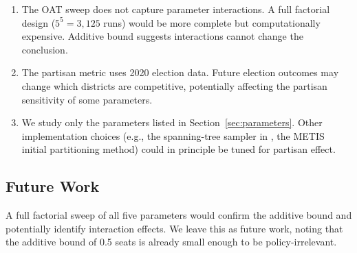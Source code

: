 \begin{enumerate}
\item The OAT sweep does not capture parameter interactions.
      A full factorial design ($5^5 = 3{,}125$ runs) would be more
      complete but computationally expensive.
      Additive bound suggests interactions cannot change the conclusion.
\item The partisan metric uses 2020 election data.
      Future election outcomes may change which districts are competitive,
      potentially affecting the partisan sensitivity of some parameters.
\item We study only the parameters listed in Section~\ref{sec:parameters}.
      Other implementation choices (e.g., the spanning-tree sampler in
      \recom{}, the METIS initial partitioning method) could in principle
      be tuned for partisan effect.
\end{enumerate}

\subsection{Future Work}

A full factorial sweep of all five parameters would confirm the additive
bound and potentially identify interaction effects.
We leave this as future work, noting that the additive bound of 0.5 seats
is already small enough to be policy-irrelevant.
